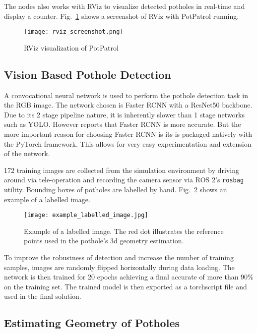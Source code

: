 \documentclass[conference]{IEEEtran}
\begin{document}
The nodes also works with RViz to visualize detected potholes in real-time and display a counter. Fig.~\ref{fig:rviz_visualisation} shows a screenshot of RViz with PotPatrol running.

\begin{figure}
    \centering
    \texttt{[image: rviz\_screenshot.png]}
    \caption{RViz visualization of PotPatrol}
    \label{fig:rviz_visualisation}
\end{figure}

\subsection{Vision Based Pothole Detection}

A convocational neural network is used to perform the pothole detection task in the RGB image. The network chosen is Faster RCNN\cite{renFasterRCNNRealTime2016} with a ResNet50\cite{heDeepResidualLearning2015} backbone. Due to its 2 stage pipeline nature, it is inherently slower than 1 stage networks such as YOLO\cite{redmonYOLOv3IncrementalImprovement2018}. However \cite{redmonYOLOv3IncrementalImprovement2018} reports that Faster RCNN is more accurate. But the more important reason for choosing Faster RCNN is its is packaged natively with the PyTorch framework. This allows for very easy experimentation and extension of the network.

172 training images are collected from the simulation environment by driving around via tele-operation and recording the camera sensor via ROS 2's \verb|rosbag| utility. Bounding boxes of potholes are labelled by hand. Fig.~\ref{fig:example_labelled_image} shows an example of a labelled image.

\begin{figure}
    \centering
    \texttt{[image: example\_labelled\_image.jpg]}
    \caption{Example of a labelled image. The red dot illustrates the reference points used in the pothole's 3d geometry estimation.}
    \label{fig:example_labelled_image}
\end{figure}

To improve the robustness of detection and increase the number of training samples, images are randomly flipped horizontally during data loading. The network is then trained for 20 epochs achieving a final accurate of more than 90\% on the training set. The trained model is then exported as a torchscript file and used in the final solution.

\subsection{Estimating Geometry of Potholes}\label{sec:estimate_geometry}
\end{document}
